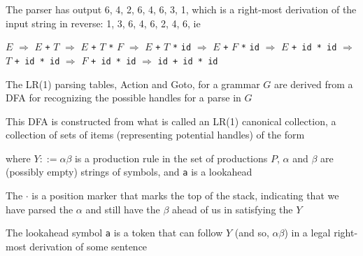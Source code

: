 \documentclass[8pt,a4paper,compress]{beamer}
\newcommand{\mm}[1]{$#1$}
\newenvironment{spaced}
{
\smallskip
\hspace{.5cm}
\begin{minipage}[c]{\textwidth}
}
{
\end{minipage}
\smallskip
}
\begin{document}
\begin{frame}[fragile]
\pause

The parser has output 6, 4, 2, 6, 4, 6, 3, 1, which is a right-most derivation of the input string in reverse: 1, 3, 6, 4, 6, 2, 4, 6, ie

\text{ }
\begin{spaced}
\begin{production}
\underline{\mm{E}} \mm{\Rightarrow} \mm{E} \lstinline{+} \underline{\mm{T}}
   \mm{\Rightarrow} \mm{E} \lstinline{+} \mm{T} \lstinline{*} \underline{\mm{F}}
   \mm{\Rightarrow} \mm{E} \lstinline{+} \underline{\mm{T}} \lstinline{*} \lstinline{id}
   \mm{\Rightarrow} \mm{E} \lstinline{+} \underline{\mm{F}} \lstinline{*} \lstinline{id}
   \mm{\Rightarrow} \underline{\mm{E}} \lstinline{+ id * id}
   \mm{\Rightarrow} \underline{\mm{T}} \lstinline{+ id * id}
   \mm{\Rightarrow} \underline{\mm{F}} \lstinline{+ id * id}
   \mm{\Rightarrow} \lstinline{id + id * id}
\end{production}
\end{spaced}
\end{frame}

\begin{frame}[fragile]
\pause

The LR(1) parsing tables, Action and Goto, for a grammar $G$ are derived from a DFA for recognizing the possible handles for a parse in $G$

\pause
\bigskip

This DFA is constructed from what is called an LR(1) canonical collection, a collection of sets of items (representing potential handles) of the form

\text{ }
\begin{spaced}
\begin{production}
[Y ::= \mm{\alpha \cdot \beta}, \lstinline{a}]
\end{production}
\end{spaced}

\noindent where $Y ::= \alpha \beta$ is a production rule in the set of productions $P$, $\alpha$ and $\beta$ are (possibly empty) strings of symbols, and \lstinline{a} is a lookahead

\pause
\bigskip

The $\cdot$ is a position marker that marks the top of the stack, indicating that we have parsed the $\alpha$ and still have the $\beta$ ahead of us in satisfying the $Y$

\pause
\bigskip

The lookahead symbol \lstinline{a} is a token that can follow $Y$ (and so, $\alpha \beta$) in a legal right-most derivation of some sentence
\end{frame}
\end{document}
